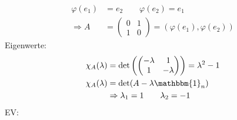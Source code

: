 \begin{align*}
    \varphi (e_1) &= e_2\qquad \varphi (e_2) = e_1 \\
    \Rightarrow A &= \begin{pmatrix} 0 & 1 \\ 1 & 0 \end{pmatrix} = \left(\varphi (e_1), \varphi (e_2)\right)
\end{align*}
Eigenwerte:
\begin{align*}
    \chi_A (\lambda) &= \text{det}\left(\begin{pmatrix} -\lambda & 1 \\ 1 & -\lambda \end{pmatrix}\right) = \lambda ^2 - 1 \\
    \chi_A (\lambda) &= \text{det}(A - \lambda \mathbbm{1}_n) \\
    &\Rightarrow \lambda _1 = 1 \qquad \lambda _2 = -1
\end{align*}
EV:
